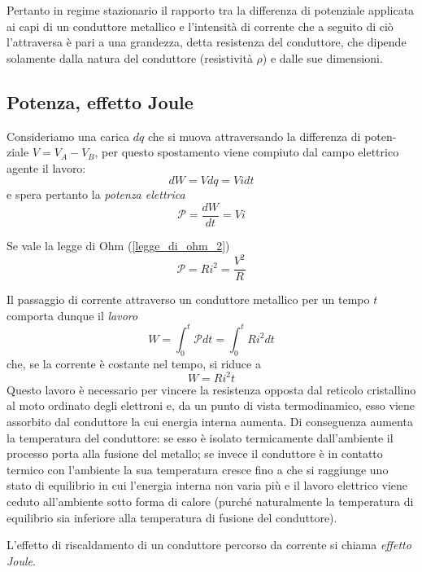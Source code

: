 \documentclass[class=book, crop=false, oneside, 12pt]{standalone}
\begin{document}
Pertanto in regime stazionario il rapporto tra la differenza di potenziale applicata ai capi di un conduttore metallico e l'intensità di corrente che a seguito di ciò l'attraversa è pari a una grandezza, detta resistenza del conduttore, che dipende solamente dalla natura del conduttore (resistività \(\rho\)) e dalle sue dimensioni.

\subsection{Potenza, effetto Joule}

Consideriamo una carica \(dq\) che si muova attraversando la differenza di poten-ziale \(V= V_A -V_B\), per questo spostamento viene compiuto dal campo elettrico agente il lavoro:
\begin{equation*}
    d W = V dq = V i dt
\end{equation*}
e spera pertanto la \emph{potenza elettrica}
\begin{equation}
    \mathcal{P} = \frac{dW}{dt} = V i
\end{equation}

Se vale la legge di Ohm (\ref{legge_di_ohm_2})
\begin{equation}
    \mathcal{P} = R i^2 = \frac{V^2}{R}
\end{equation}

Il passaggio di corrente attraverso un conduttore metallico per un tempo \(t\) comporta dunque il \emph{lavoro} 
\begin{equation}
    W = \int_0^t \mathcal{P} dt = \int_0^t R i^2 dt
\end{equation}
che, se la corrente è costante nel tempo, si riduce a
\begin{equation}
    W = R i^2 t
\end{equation}
Questo lavoro è necessario per vincere la resistenza opposta dal reticolo cristallino al moto ordinato degli elettroni e, da un punto di vista termodinamico, esso viene assorbito dal conduttore la cui energia interna aumenta. 
Di conseguenza aumenta la temperatura del conduttore: se esso è isolato termicamente dall'ambiente il processo porta alla fusione del metallo; se invece il conduttore è in contatto termico con l'ambiente la sua temperatura cresce fino a che si raggiunge uno stato di equilibrio in cui l'energia interna non varia più e il lavoro elettrico viene ceduto all'ambiente sotto forma di calore (purché naturalmente la temperatura di equilibrio sia inferiore alla temperatura di fusione del conduttore). 

L'effetto di riscaldamento di un conduttore percorso da corrente si chiama \emph{effetto Joule}. 
\end{document}
